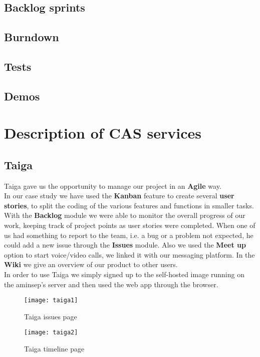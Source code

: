 \documentclass[a4paper,10pt]{report}
\begin{document}
\section{Backlog sprints} %
\section{Burndown} %
\section{Tests} %
\section{Demos} %
\chapter{Description of CAS services} %
\section[Taiga]{Taiga} %
Taiga gave us the opportunity to manage our project in an \textbf{Agile} way. \\
In our case study we have used the \textbf{Kanban} feature to create several \textbf{user stories}, to split the coding of the various features and functions in smaller tasks. With the \textbf{Backlog} module we were able to monitor the overall progress of our work, keeping track of project points as user stories were completed. When one of us had something to report to the team, i.e. a bug or a problem not expected, he could add a new issue through the \textbf{Issues} module.
Also we used the \textbf{Meet up} option to start voice/video calls, we linked it with our messaging platform.
In the \textbf{Wiki} we give an overview of our product to other users.\\
In order to use Taiga we simply signed up to the self-hosted image running on the aminsep's server and then used the web app through the browser.
\begin{figure}[H]
	\centering
    \texttt{[image: taiga1]}
    \caption{Taiga issues page}
    \label{fig:taiga1}
\end{figure}
\begin{figure}[H]
	\centering
    \texttt{[image: taiga2]}
    \caption{Taiga timeline page}
    \label{fig:taiga2}
\end{figure}
\end{document}
